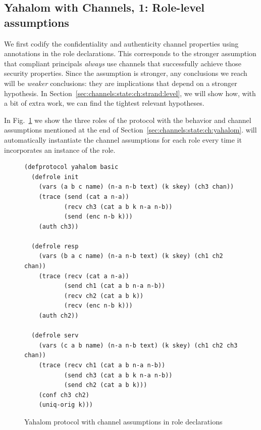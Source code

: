 \subsection{Yahalom with Channels, 1:  Role-level assumptions}
\label{sec:channels:state:ch:role:level}

We first codify the confidentiality and authenticity channel
properties using annotations in the role declarations.  This
corresponds to the stronger assumption that compliant principals
\emph{always} use channels that successfully achieve those security
properties.  Since the assumption is stronger, any conclusions we
reach will be \emph{weaker} conclusions: they are implications that
depend on a stronger hypothesis.  In
Section~\ref{sec:channels:state:ch:strand:level}, we will show how,
with a bit of extra work, we can find the tightest relevant
hypotheses.

In Fig.~\ref{fig:yahalom:ch:role} we show the three roles of the
protocol with the behavior and channel assumptions mentioned at the
end of Section~\ref{sec:channels:state:ch:yahalom}.  {\cpsa} will
automatically instantiate the channel assumptions for each role every
time it incorporates an instance of the role.   
%
\begin{figure}\small
%
\begin{verbatim}(defprotocol yahalom basic
  (defrole init
    (vars (a b c name) (n-a n-b text) (k skey) (ch3 chan))
    (trace (send (cat a n-a))
           (recv ch3 (cat a b k n-a n-b))
           (send (enc n-b k)))
    (auth ch3))

  (defrole resp
    (vars (b a c name) (n-a n-b text) (k skey) (ch1 ch2 chan))
    (trace (recv (cat a n-a))
           (send ch1 (cat a b n-a n-b))
           (recv ch2 (cat a b k))
           (recv (enc n-b k)))
    (auth ch2))

  (defrole serv
    (vars (c a b name) (n-a n-b text) (k skey) (ch1 ch2 ch3 chan))
    (trace (recv ch1 (cat a b n-a n-b))
           (send ch3 (cat a b k n-a n-b))
           (send ch2 (cat a b k)))
    (conf ch3 ch2)
    (uniq-orig k)))\end{verbatim}
  \caption[Yahalom (role decls.)]{Yahalom protocol with channel
    assumptions in role declarations}
  \label{fig:yahalom:ch:role}
\end{figure}


